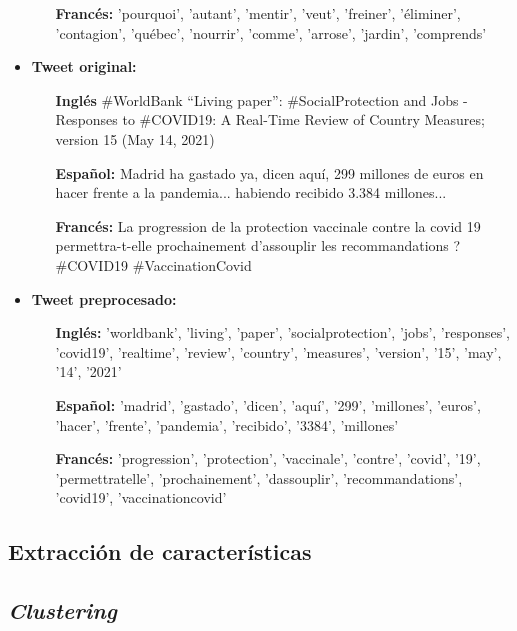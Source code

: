 \begin{itemize}
\begin{itemize}
        \item [\textbf{Francés:}] 'pourquoi', 'autant', 'mentir', 'veut', 'freiner', 'éliminer', 'contagion', 'québec', 'nourrir', 'comme', 'arrose', 'jardin', 'comprends'
    \end{itemize}
    \item \textbf{Tweet original:}
    \begin{itemize}
        \item [\textbf{Inglés}] \#WorldBank “Living paper”: \#SocialProtection and Jobs - Responses to \#COVID19: A Real-Time Review of Country Measures; version 15 (May 14, 2021)
        \item [\textbf{Español:}] Madrid ha gastado ya, dicen aquí, 299 millones de euros en hacer frente a la pandemia... habiendo recibido 3.384 millones...
        \item [\textbf{Francés:}] La progression de la protection vaccinale contre la covid 19 permettra-t-elle prochainement d'assouplir les recommandations ? \#COVID19 \#VaccinationCovid 
    \end{itemize}
    \item \textbf{Tweet preprocesado:}\\ 
    \begin{itemize}
        \item [\textbf{Inglés:}] 'worldbank', 'living', 'paper', 'socialprotection', 'jobs', 'responses', 'covid19', 'realtime', 'review', 'country', 'measures', 'version', '15', 'may', '14', '2021'
        \item [\textbf{Español:}] 'madrid', 'gastado', 'dicen', 'aquí', '299', 'millones', 'euros', 'hacer', 'frente', 'pandemia', 'recibido', '3384', 'millones'
        \item [\textbf{Francés:}] 'progression', 'protection', 'vaccinale', 'contre', 'covid', '19', 'permettratelle', 'prochainement', 'dassouplir', 'recommandations', 'covid19', 'vaccinationcovid'
    \end{itemize}
\end{itemize}


\subsection{Extracción de características}
\subsection{\textit{Clustering}}
